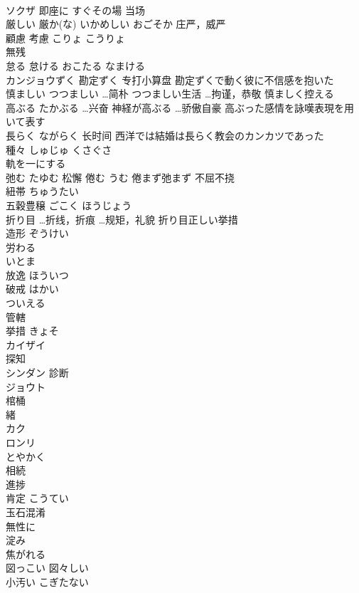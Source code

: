 \documentclass[8pt]{extreport}
\begin{document}
\begin{CJK}{UTF8}{min}
\\	ソクザ	即座に すぐその場 当场
\\	厳しい 厳か(な)	いかめしい おごそか 庄严，威严
\\	顧慮 考慮	こりょ こうりょ
\\	無残	
\\	怠る 怠ける	おこたる なまける
\\	カンジョウずく	勘定ずく 专打小算盘 勘定ずくで動く彼に不信感を抱いた
\\	慎ましい	つつましい …简朴 つつましい生活 …拘谨，恭敬 慎ましく控える
\\	高ぶる	たかぶる …兴奋 神経が高ぶる …骄傲自豪 高ぶった感情を詠嘆表現を用いて表す
\\	長らく	ながらく 长时间 西洋では結婚は長らく教会のカンカツであった
\\	種々	しゅじゅ くさぐさ
\\	軌を一にする	
\\	弛む	たゆむ 松懈 倦む うむ 倦まず弛まず 不屈不挠
\\	紐帯	ちゅうたい
\\	五穀豊穣	ごこく ほうじょう
\\	折り目	…折线，折痕 …规矩，礼貌 折り目正しい挙措
\\	造形	ぞうけい
\\	労わる	
\\	いとま	
\\	放逸	ほういつ
\\	破戒	はかい
\\	ついえる	
\\	管轄	
\\	挙措	きょそ
\\	カイザイ	
\\	探知	
\\	シンダン	診断
\\	ジョウト	
\\	棺桶	
\\	緒	
\\	カク	
\\	ロンリ	
\\	とやかく	
\\	相続	
\\	進捗	
\\	肯定	こうてい
\\	玉石混淆	
\\	無性に	
\\	淀み	
\\	焦がれる	
\\	図っこい 図々しい	
\\	小汚い	こぎたない

\end{CJK}
\end{document}
